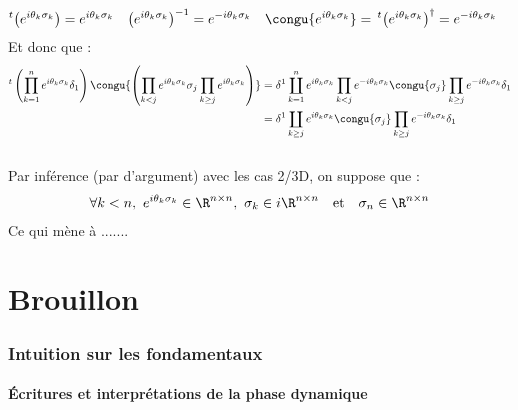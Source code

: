 \begin{demo}
\begin{align*}
		^t\big(e^{i\theta_k\sigma_k}\big) &= e^{i\theta_k\sigma_k}  &  \big(e^{i\theta_k\sigma_k}\big)^{-1} &= e^{-i\theta_k\sigma_k}  &  \congu{e^{i\theta_k\sigma_k}} &=\, ^t\big(e^{i\theta_k\sigma_k}\big)^\dagger = e^{-i\theta_k\sigma_k}
	\end{align*}
	Et donc que :
	\begin{align*}
		^t\left( \prod_{k=1}^n e^{i\theta_k\sigma_k}\delta_1 \right) \congu{\left(\prod_{k<j} e^{i\theta_k\sigma_k} \sigma_j \prod_{k\geq j} e^{i\theta_k\sigma_k} \right)} 
			&= \delta^1 \coprod_{k=1}^n e^{i\theta_k\sigma_k} \prod_{k<j} e^{-i\theta_k\sigma_k} \congu{\sigma_j} \prod_{k\geq j} e^{-i\theta_k\sigma_k}\delta_1 \\
		&= \delta^1 \coprod_{k\geq j} e^{i\theta_k\sigma_k} \congu{\sigma_j} \prod_{k\geq j} e^{-i\theta_k\sigma_k}\delta_1
	\end{align*}
	\\
	Par inférence (par d'argument) avec les cas 2/3D, on suppose que :
	\begin{align*}
		\forall k<n&,\ e^{i\theta_k\sigma_k}\in\R^{n\times n},\ \sigma_k\in i\R^{n\times n}  &  &\text{et}  &  \sigma_n\in\R^{n\times n}
	\end{align*}
	Ce qui mène à .......
\end{demo}


\setcounter{figure}{0}
\setcounter{lstlisting}{0}

\part{Brouillon}

\section{Intuition sur les fondamentaux}

\subsection{Écritures et interprétations de la phase dynamique}

